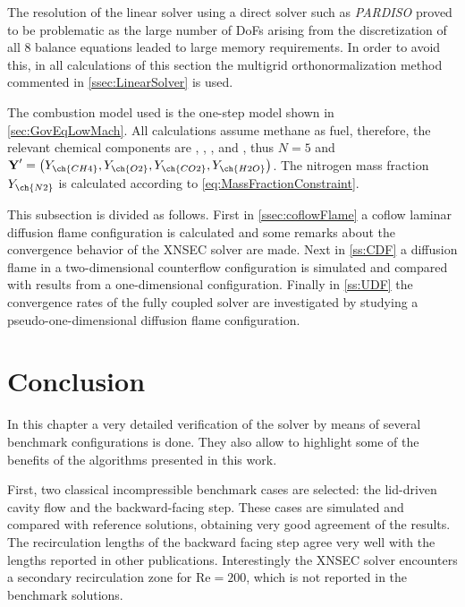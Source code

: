 The resolution of the linear solver using a direct solver such as \textit{PARDISO} proved to be problematic as the large number of DoFs arising from the discretization of all 8 balance equations leaded to large memory requirements.  In order to avoid this, in all calculations of this section the multigrid orthonormalization method commented in \cref{ssec:LinearSolver} is used.

The combustion model used is the one-step model shown in \cref{sec:GovEqLowMach}. All calculations assume methane as fuel, therefore, the relevant chemical components are , , ,  and , thus $N = 5$ and $\vec{Y}' = \left(Y_{\ch{CH4}},Y_{\ch{O2}},Y_{\ch{CO2}},Y_{\ch{H2O}}\right)$. The nitrogen mass fraction $Y_{\ch{N2}}$ is calculated according to \cref{eq:MassFractionConstraint}.%

This subsection is divided as follows. First in \cref{ssec:coflowFlame} a coflow laminar diffusion flame configuration is calculated and some remarks about the convergence behavior of the XNSEC solver are made. Next in \cref{ss:CDF} a diffusion flame in a two-dimensional counterflow configuration is simulated and compared with results from a one-dimensional configuration. Finally in \cref{ss:UDF} the convergence rates of the fully coupled solver are investigated by studying a pseudo-one-dimensional diffusion flame configuration.







\section{Conclusion}
In this chapter a very detailed verification of the solver by means of several benchmark configurations is done. They also allow to highlight some of the benefits of the algorithms presented in this work.

First, two classical incompressible benchmark cases are selected: the lid-driven cavity flow and the backward-facing step. These cases are simulated and compared with reference solutions, obtaining very good agreement of the results. The recirculation lengths of the backward facing step agree very well with the lengths reported in other publications. Interestingly the XNSEC solver encounters a secondary recirculation zone for $\text{Re} = 200$, which is not reported in the benchmark solutions.

